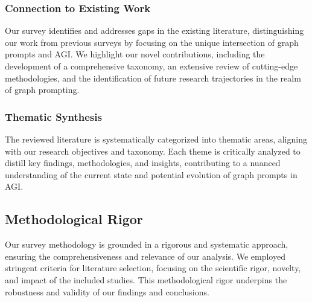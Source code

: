 \subsubsection{Connection to Existing Work}
Our survey identifies and addresses gaps in the existing literature, distinguishing our work from previous surveys by focusing on the unique intersection of graph prompts and AGI. We highlight our novel contributions, including the development of a comprehensive taxonomy, an extensive review of cutting-edge methodologies, and the identification of future research trajectories in the realm of graph prompting.

\subsubsection{Thematic Synthesis}
The reviewed literature is systematically categorized into thematic areas, aligning with our research objectives and taxonomy. Each theme is critically analyzed to distill key findings, methodologies, and insights, contributing to a nuanced understanding of the current state and potential evolution of graph prompts in AGI.

\subsection{Methodological Rigor}
Our survey methodology is grounded in a rigorous and systematic approach, ensuring the comprehensiveness and relevance of our analysis. We employed stringent criteria for literature selection, focusing on the scientific rigor, novelty, and impact of the included studies. This methodological rigor underpins the robustness and validity of our findings and conclusions.

